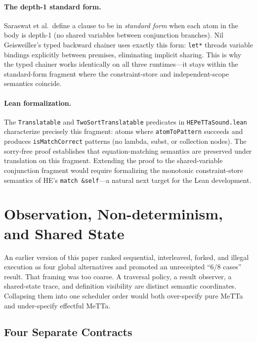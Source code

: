 \documentclass[11pt]{article}
\newcommand{\code}[1]{\texttt{#1}}
\newcommand{\HE}{\textup{HE}}
\begin{document}
\paragraph{The depth-1 standard form.}
Saraswat et al.\ define a clause to be in \emph{standard form} when
each atom in the body is depth-1 (no shared variables between
conjunction branches).  Nil Geisweiller's typed backward chainer
uses exactly this form: \code{let*} threads variable bindings
explicitly between premises, eliminating implicit sharing.  This is
why the typed chainer works identically on all three runtimes---it
stays within the standard-form fragment where the constraint-store
and independent-scope semantics coincide.

\paragraph{Lean formalization.}
The \code{Translatable} and \code{TwoSortTranslatable} predicates in
\code{HEPeTTaSound.lean} characterize precisely this fragment: atoms
where \code{atomToPattern} succeeds and produces
\code{isMatchCorrect} patterns (no lambda, subst, or collection
nodes).  The sorry-free proof establishes that equation-matching
semantics are preserved under translation on this fragment.  Extending
the proof to the shared-variable conjunction fragment would require
formalizing the monotonic constraint-store semantics of \HE{}'s
\code{match~\&self}---a natural next target for the Lean development.

\section{Observation, Non-determinism, and Shared State}
\label{sec:nondet-state}

An earlier version of this paper ranked sequential, interleaved, forked, and
illegal execution as four global alternatives and promoted an unreceipted
``6/8 cases'' result.  That framing was too coarse.  A traversal policy, a
result observer, a shared-state trace, and definition visibility are distinct
semantic coordinates.  Collapsing them into one scheduler order would both
over-specify pure MeTTa and under-specify effectful MeTTa.

\subsection{Four Separate Contracts}
\end{document}
